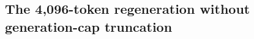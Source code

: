 \FloatBarrier
\subsection{The 4,096-token regeneration without generation-cap truncation}
\label{app-rep4k}

